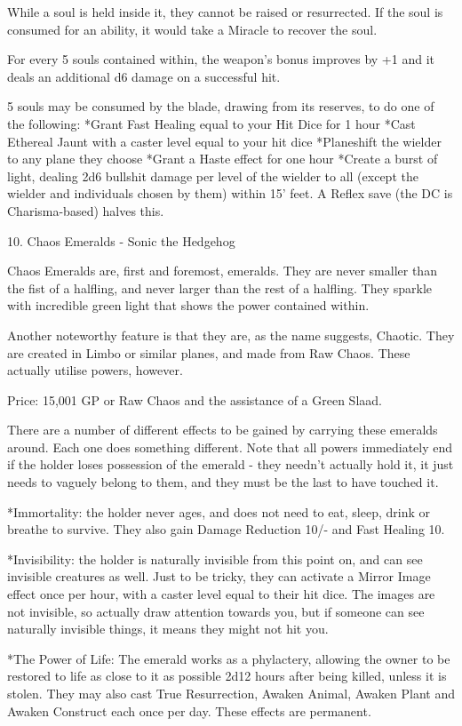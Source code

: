 \begin{multicols}{2}
While a soul is held inside it, they cannot be raised or resurrected. If the soul is consumed for an ability, it would take a Miracle to recover the soul.

For every 5 souls contained within, the weapon's bonus improves by +1 and it deals an additional d6 damage on a successful hit.

5 souls may be consumed by the blade, drawing from its reserves, to do one of the following:
*Grant Fast Healing equal to your Hit Dice for 1 hour
*Cast Ethereal Jaunt with a caster level equal to your hit dice
*Planeshift the wielder to any plane they choose
*Grant a Haste effect for one hour
*Create a burst of light, dealing 2d6 bullshit damage per level of the wielder to all (except the wielder and individuals chosen by them) within 15' feet. A Reflex save (the DC is Charisma-based) halves this.


10. Chaos Emeralds - Sonic the Hedgehog

Chaos Emeralds are, first and foremost, emeralds. They are never smaller than the fist of a halfling, and never larger than the rest of a halfling. They sparkle with incredible green light that shows the power contained within.

Another noteworthy feature is that they are, as the name suggests, Chaotic. They are created in Limbo or similar planes, and made from Raw Chaos. These actually utilise powers, however.

Price: 15,001 GP or Raw Chaos and the assistance of a Green Slaad.

There are a number of different effects to be gained by carrying these emeralds around. Each one does something different. Note that all powers immediately end if the holder loses possession of the emerald - they needn't actually hold it, it just needs to vaguely belong to them, and they must be the last to have touched it.

*Immortality: the holder never ages, and does not need to eat, sleep, drink or breathe to survive. They also gain Damage Reduction 10/- and Fast Healing 10.

*Invisibility: the holder is naturally invisible from this point on, and can see invisible creatures as well. Just to be tricky, they can activate a Mirror Image effect once per hour, with a caster level equal to their hit dice. The images are not invisible, so actually draw attention towards you, but if someone can see naturally invisible things, it means they might not hit you.

*The Power of Life: The emerald works as a phylactery, allowing the owner to be restored to life as close to it as possible 2d12 hours after being killed, unless it is stolen. They may also cast True Resurrection, Awaken Animal, Awaken Plant and Awaken Construct each once per day. These effects are permanent.


\end{multicols}
